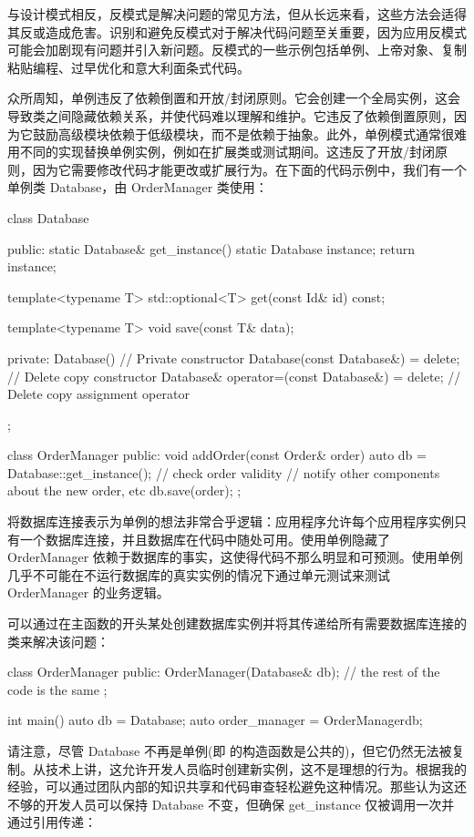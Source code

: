 
与设计模式相反，反模式是解决问题的常见方法，但从长远来看，这些方法会适得其反或造成危害。识别和避免反模式对于解决代码问题至关重要，因为应用反模式可能会加剧现有问题并引入新问题。反模式的一些示例包括单例、上帝对象、复制粘贴编程、过早优化和意大利面条式代码。

众所周知，单例违反了依赖倒置和开放/封闭原则。它会创建一个全局实例，这会导致类之间隐藏依赖关系，并使代码难以理解和维护。它违反了依赖倒置原则，因为它鼓励高级模块依赖于低级模块，而不是依赖于抽象。此外，单例模式通常很难用不同的实现替换单例实例，例如在扩展类或测试期间。这违反了开放/封闭原则，因为它需要修改代码才能更改或扩展行为。在下面的代码示例中，我们有一个单例类 Database，由 OrderManager 类使用：

\begin{cpp}
class Database {
    public:
    static Database& get_instance() {
        static Database instance;
        return instance;
    }

    template<typename T>
    std::optional<T> get(const Id& id) const;

    template<typename T>
    void save(const T& data);

private:
    Database() {} // Private constructor
    Database(const Database&) = delete; // Delete copy constructor
    Database& operator=(const Database&) = delete; // Delete copy assignment operator
};

class OrderManager {
public:
    void addOrder(const Order& order) {
        auto db = Database::get_instance();
        // check order validity
        // notify other components about the new order, etc
        db.save(order);
    }
};
\end{cpp}

将数据库连接表示为单例的想法非常合乎逻辑：应用程序允许每个应用程序实例只有一个数据库连接，并且数据库在代码中随处可用。使用单例隐藏了 OrderManager 依赖于数据库的事实，这使得代码不那么明显和可预测。使用单例几乎不可能在不运行数据库的真实实例的情况下通过单元测试来测试 OrderManager 的业务逻辑。

可以通过在主函数的开头某处创建数据库实例并将其传递给所有需要数据库连接的类来解决该问题：

\begin{cpp}
class OrderManager {
    public:
    OrderManager(Database& db);
    // the rest of the code is the same
};

int main() {
    auto db = Database{};
    auto order_manager = OrderManager{db};
}
\end{cpp}

请注意，尽管 Database 不再是单例(即 的构造函数是公共的)，但它仍然无法被复制。从技术上讲，这允许开发人员临时创建新实例，这不是理想的行为。根据我的经验，可以通过团队内部的知识共享和代码审查轻松避免这种情况。那些认为这还不够的开发人员可以保持 Database 不变，但确保 get\_instance 仅被调用一次并通过引用传递：

